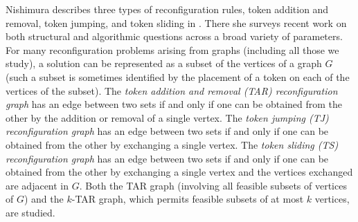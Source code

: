 \documentclass{article}
\numberwithin{figure}{section}   %
\theoremstyle{definition}
\theoremstyle{definition}
\theoremstyle{definition}
\newcommand{\cg}[1]{{\textcolor{red}{[}\textcolor{red}{{CG: \em #1}]}}}
\begin{document}
Nishimura describes three types of reconfiguration rules, token addition and removal, token jumping, and token sliding in \cite{N18}.  There she surveys recent work on both structural and algorithmic questions   across a broad variety of parameters. For many reconfiguration problems arising from  graphs (including all those we study), a solution can be represented as a subset of the vertices of a graph $G$ (such a subset is sometimes identified by the placement of a token on each of the vertices of the subset). The \emph{token addition and removal (TAR) reconfiguration graph} has an edge between two sets  if and only if one can be obtained from the other by the addition or removal of a single vertex.  The \emph{token jumping (TJ) reconfiguration graph} has an edge between two sets  if and only if one can be obtained from the other by exchanging a single vertex.  The \emph{token sliding (TS) reconfiguration graph} has an edge between two sets  if and only if one can be obtained from the other by exchanging a single vertex and the vertices exchanged are adjacent in $G$. Both the TAR graph (involving all feasible subsets of vertices of $G$) and the $k$-TAR graph, which permits feasible subsets of at most $k$ vertices, are studied. %
\end{document}
